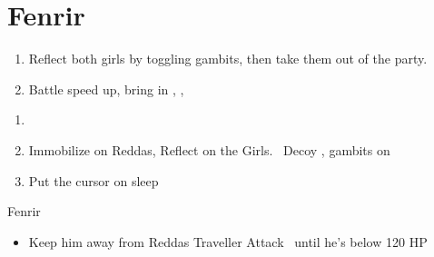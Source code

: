 \chapter{Fenrir}

\begin{enumerate}
	\item Reflect both girls by toggling gambits, then take them out of the party.
	\item Battle speed up, bring in \balthier, \ashe, \penelo
\end{enumerate}

\begin{gambit}
	\begin{itemize}
	\end{itemize}
\end{gambit}
\begin{enumerate}
	\item \leader{\balthier}
	\item Immobilize on Reddas, Reflect on the Girls. \ashe\ Decoy \balthier, gambits on
	\item Put the cursor on sleep
\end{enumerate}
\begin{battle}{Fenrir}
	\begin{itemize}
		\balthierf Run backwards diagonal, spam Sleep
		\item Keep him away from Reddas
		      \balthierf Traveller
		      \balthierf Attack \balthier\ until he's below 120 HP
	\end{itemize}
\end{battle}